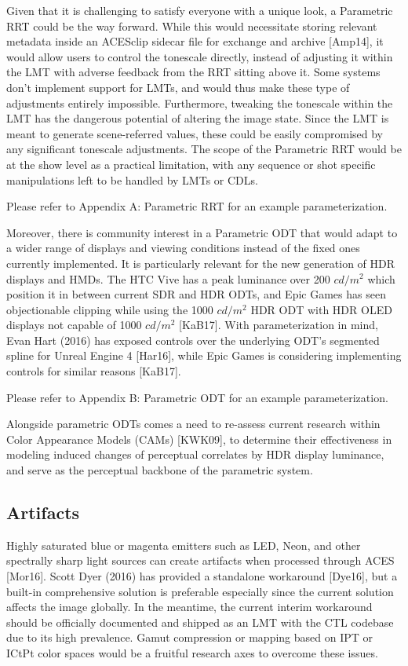 \documentclass[conference]{IEEEtran}
\begin{document}
Given that it is challenging to satisfy everyone with a unique look, a Parametric RRT could be the way forward. While this would necessitate storing relevant metadata inside an ACESclip sidecar file for exchange and archive [Amp14], it would allow users to control the tonescale directly, instead of adjusting it within the LMT with adverse feedback from the RRT sitting above it. Some systems don't implement support for LMTs, and would thus make these type of adjustments entirely impossible. Furthermore, tweaking the tonescale within the LMT has the dangerous potential of altering the image state. Since the LMT is meant to generate scene-referred values, these could be easily compromised by any significant tonescale adjustments. The scope of the Parametric RRT would be at the show level as a practical limitation, with any sequence or shot specific manipulations left to be handled by LMTs or CDLs.

Please refer to Appendix A: Parametric RRT for an example parameterization.

Moreover, there is community interest in a Parametric ODT that would adapt to a wider range of displays and viewing conditions instead of the fixed ones currently implemented. It is particularly relevant for the new generation of HDR displays and HMDs. The HTC Vive has a peak luminance over 200 $cd/m^2$ which position it in between current SDR and HDR ODTs, and Epic Games has seen objectionable clipping while using the 1000 $cd/m^2$ HDR ODT with HDR OLED displays not capable of 1000 $cd/m^2$ [KaB17]. With parameterization in mind, Evan Hart (2016) has exposed controls over the underlying ODT's segmented spline for Unreal Engine 4 [Har16], while Epic Games is considering implementing controls for similar reasons [KaB17].

Please refer to Appendix B: Parametric ODT for an example parameterization.

Alongside parametric ODTs comes a need to re-assess current research within Color Appearance Models (CAMs) [KWK09], to determine their effectiveness in modeling induced changes of perceptual correlates by HDR display luminance, and serve as the perceptual backbone of the parametric system.

\subsection{Artifacts}
Highly saturated blue or magenta emitters such as LED, Neon, and other spectrally sharp light sources can create artifacts when processed through ACES [Mor16]. Scott Dyer (2016) has provided a standalone workaround [Dye16], but a built-in comprehensive solution is preferable especially since the current solution affects the image globally. In the meantime, the current interim workaround should be officially documented and shipped as an LMT with the CTL codebase due to its high prevalence. Gamut compression or mapping based on IPT or ICtPt color spaces would be a fruitful research axes to overcome these issues.
\end{document}
